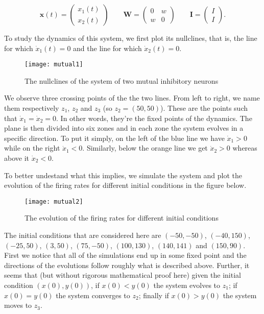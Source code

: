 \[
  \mathbf{x}(t) = \left(
    \begin{array}{c}
      x_1(t)\\
      x_2(t)
    \end{array}\right) \qquad
  \mathbf{W} = \left(
    \begin{array}{cc}
      0 & w\\
      w & 0
    \end{array}\right) \qquad
  \mathbf{I} = \left(
    \begin{array}{c}
      I\\
      I
    \end{array}\right).
\]

To study the dynamics of this system, we first plot its nullclines, that is,
the line for which $\dot{x}_1(t)=0$ and the line for which $\dot{x}_2(t)=0$.

\begin{figure}[H]
  \centering
  \texttt{[image: mutual1]}
  \caption
    {The nullclines of the system of two mutual inhibitory neurons}
\end{figure}

We observe three crossing points of the the two lines. From left to right,
we name them respectively $z_1$, $z_2$ and $z_3$ (so $z_2 = (50,50)$).
These are the points such that $\dot{x}_1 = \dot{x}_2 = 0$. In other words,
they're the fixed points of the dynamics. The plane is then divided into six
zones and in each zone the system evolves in a specific direction. To put it
simply, on the left of the blue line we have $\dot{x}_1 > 0$ while on the
right $\dot{x}_1 < 0$. Similarly, below the orange line we get
$\dot{x}_2 > 0$ whereas above it $\dot{x}_2 < 0$.

To better undestand what this implies, we simulate the system and plot the 
evolution of the firing rates for different initial conditions in the figure 
below.

\begin{figure}[H]
  \centering
  \texttt{[image: mutual2]}
  \caption
    {The evolution of the firing rates for different initial conditions}
\end{figure}

The initial conditions that are considered here are $(-50, -50)$, $(-40, 150)$,
$(-25, 50)$, $(3, 50)$, $(75, -50)$, $(100, 130)$, $(140, 141)$ and 
$(150, 90)$. First we notice that all of the simulations end up in some fixed
point and the directions of the evolutions follow roughly what is described
above. Further, it seems that (but without rigorous mathematical proof here)
given the initial condition $(x(0),y(0))$, if $x(0) < y(0)$ the system evolves
to $z_1$; if $x(0) = y(0)$ the system converges to $z_2$; finally if 
$x(0) > y(0)$ the system moves to $z_3$.

